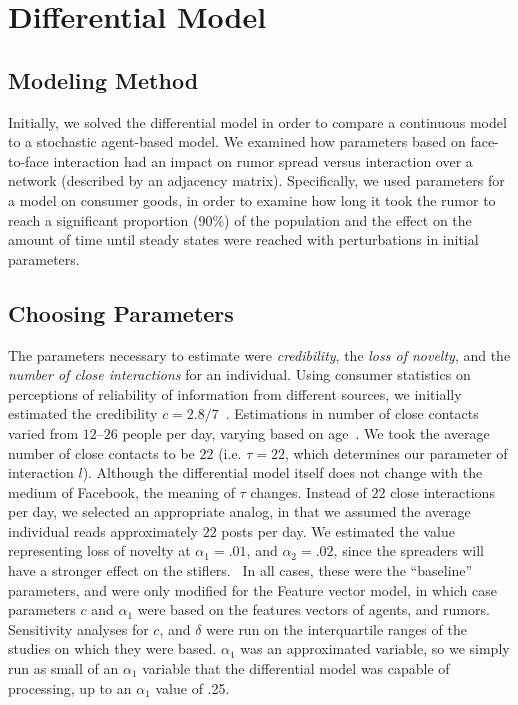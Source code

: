 \section{Differential Model }
\label{sec:diffmodel}

\subsection{Modeling Method}
\label{subsec:diffmodeapp}

Initially, we solved the differential model in order to compare a continuous model to a stochastic agent-based model.
We examined how parameters based on face-to-face interaction had an impact on rumor spread versus interaction over a network (described by an adjacency matrix).
Specifically, we used parameters for a model on consumer goods, in order to examine how long it took the rumor to reach a significant proportion (90\%) of the population and the effect on the amount of time until steady states were reached with perturbations in initial parameters.

\subsection{Choosing Parameters}
\label{subsec:diffmodeeparam}

The parameters necessary to estimate were \textit{credibility}, the
\textit{loss of novelty}, and the \textit{number of close interactions} for an individual.
Using consumer statistics on perceptions of reliability of information from different sources, we initially estimated the credibility $ c = 2.8/7 $~\cite{kamins-1997}.
Estimations in number of close contacts varied from $ 12 $--$ 26 $ people per day, varying based on age~\cite{cahill-1996, mossong-2008, edmunds-2006}.
We took the average number of close contacts to be $ 22 $ (i.e. $ \tau = 22 $, which determines our parameter of interaction $ l $).
Although the differential model itself does not change with the medium of Facebook, the meaning of $ \tau $ changes.
Instead of $ 22 $ close interactions per day, we selected an appropriate analog, in that we assumed the average individual reads approximately $ 22 $ posts per day.
We estimated the value representing loss of novelty at $ \alpha_1 = .01 $, and $ \alpha_2 = .02 $, since the spreaders will have a stronger effect on the stiflers.
\
In all cases, these were the ``baseline'' parameters, and were only modified for the Feature vector model, in which case parameters $ c $ and $ \alpha_1 $ were based on the features vectors of agents, and rumors.
Sensitivity analyses for $ c $, and $ \delta $ were run on the interquartile ranges of the studies on which they were based.
$ \alpha_1 $ was an approximated variable, so we simply run as small of an $ \alpha_1 $ variable that the differential model was capable of processing, up to an $ \alpha_1 $ value of .25.
